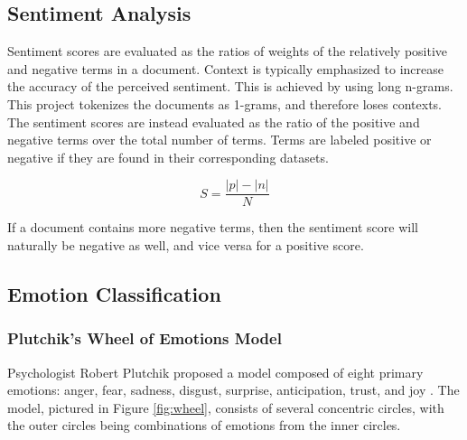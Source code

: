 \documentclass[11pt]{article}
\begin{document}
\subsection{Sentiment Analysis}

Sentiment scores are evaluated as the ratios of weights of the relatively positive and negative terms in a document. Context is typically emphasized to increase the accuracy of the perceived sentiment. This is achieved by using long n-grams. This project tokenizes the documents as 1-grams, and therefore loses contexts. The sentiment scores are instead evaluated as the ratio of the positive and negative terms over the total number of terms. Terms are labeled positive or negative if they are found in their corresponding datasets.

\begin{equation}
  S = \frac{|p| - |n|}{N}
\end{equation}

If a document contains more negative terms, then the sentiment score will naturally be negative as well, and vice versa for a positive score.

\subsection{Emotion Classification}

\subsubsection{Plutchik's Wheel of Emotions Model}

Psychologist Robert Plutchik proposed a model composed of eight primary emotions: anger, fear, sadness, disgust, surprise, anticipation, trust, and joy \cite{wheel}. The model, pictured in Figure \ref{fig:wheel}, consists of several concentric circles, with the outer circles being combinations of emotions from the inner circles.
\end{document}
